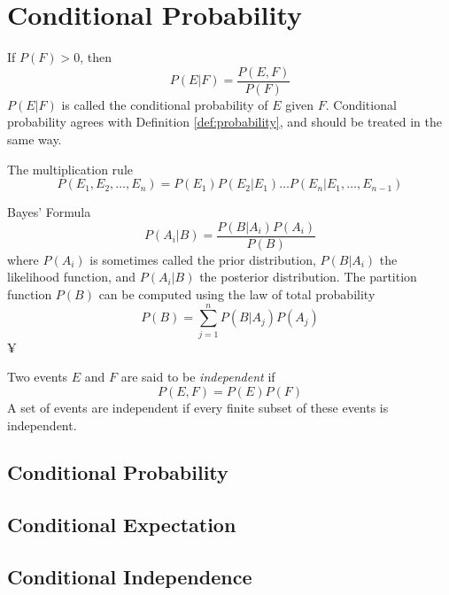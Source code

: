 \chapter{Conditional Probability}
\begin{deff}
	If $P(F) > 0$, then
	\begin{equation}
		P(E|F) = \frac{P(E,F)}{P(F)}
	\end{equation}
	$P(E|F)$ is called the conditional probability of $E$ given $F$. Conditional probability agrees with Definition \ref{def:probability}, and should be treated in the same way.
\end{deff}

\begin{deff}
	The multiplication rule
	\begin{equation}
		P(E_1, E_2, \ldots, E_n) = P(E_1) P(E_2|E_1) \ldots P(E_n|E_1, \ldots, E_{n-1})
	\end{equation}
\end{deff}

\begin{deff}
	Bayes' Formula
	\begin{equation}
		P(A_i|B) = \frac{P(B|A_i)P(A_i)}{P(B)}
	\end{equation}
	where $P(A_i)$ is sometimes called the prior distribution, $P(B|A_i)$ the likelihood function, and $P(A_i|B)$ the posterior distribution. The partition function $P(B)$ can be computed using the law of total probability
	\begin{equation}
		P(B) = \sum^n_{j=1}P(B|A_j)P(A_j)
	\end{equation}¥
\end{deff}

\begin{deff}
	Two events $E$ and $F$ are said to be {\em{independent}} if	
	\begin{equation}
		P(E,F) = P(E)P(F)
	\end{equation}
	A set of events are independent if every finite subset of these events is independent.
\end{deff}

\section{Conditional Probability}
\section{Conditional Expectation}
\section{Conditional Independence}